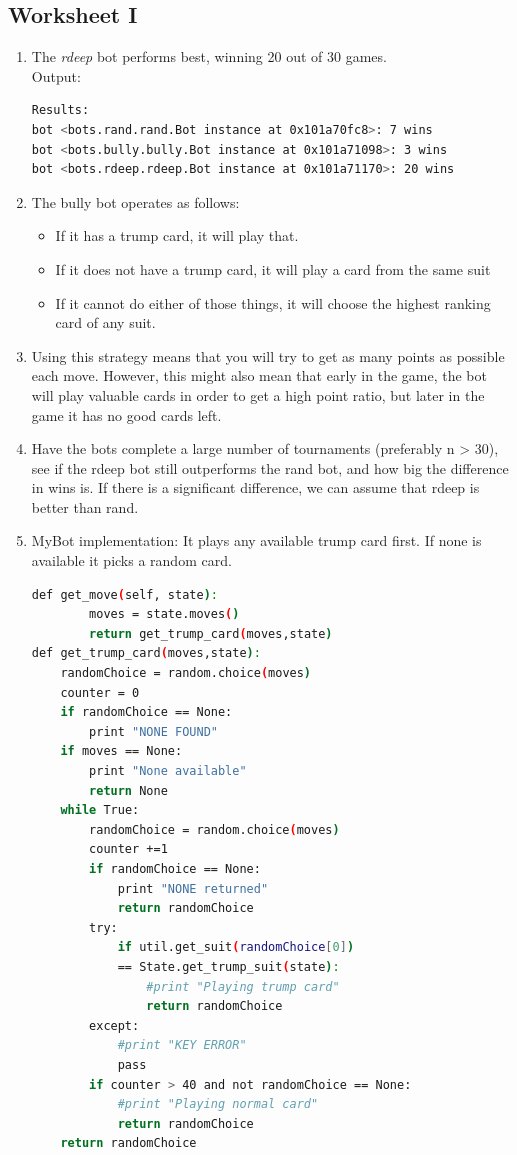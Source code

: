 \documentclass[a4paper,11pt]{article}
\begin{document}
\subsection{Worksheet I}
\begin{enumerate}

\item The \textit{rdeep} bot performs best, winning 20 out of 30 games. \\
Output:
\begin{lstlisting}[language=bash]
Results:
bot <bots.rand.rand.Bot instance at 0x101a70fc8>: 7 wins
bot <bots.bully.bully.Bot instance at 0x101a71098>: 3 wins
bot <bots.rdeep.rdeep.Bot instance at 0x101a71170>: 20 wins
\end{lstlisting}

\item The bully bot operates as follows:
\begin{itemize}
\item If it has a trump card, it will play that.
\item If it does not have a trump card, it will play a card from the same suit
\item If it cannot do either of those things, it will choose the highest ranking card of any suit.
\end{itemize}

\item Using this strategy means that you will try to get as many points as possible each move. However, this might also mean that early in the game, the bot will play valuable cards in order to get a high point ratio, but later in the game it has no good cards left. 

\item Have the bots complete a large number of tournaments (preferably n > 30), see if the rdeep bot still outperforms the rand bot, and how big the difference in wins is. If there is a significant difference, we can assume that rdeep is better than rand.

\item MyBot implementation:
It plays any available trump card first. If none is available it picks a random card.

\begin{lstlisting}[language=bash]
def get_move(self, state):
        moves = state.moves()
        return get_trump_card(moves,state)
def get_trump_card(moves,state):
    randomChoice = random.choice(moves)
    counter = 0
    if randomChoice == None:
        print "NONE FOUND"
    if moves == None:
        print "None available"
        return None
    while True:
        randomChoice = random.choice(moves)
        counter +=1
        if randomChoice == None:
            print "NONE returned"
            return randomChoice
        try:
            if util.get_suit(randomChoice[0]) 
            == State.get_trump_suit(state):
                #print "Playing trump card"
                return randomChoice
        except:
            #print "KEY ERROR"
            pass
        if counter > 40 and not randomChoice == None:
            #print "Playing normal card"
            return randomChoice
    return randomChoice
\end{lstlisting}


\end{enumerate}
\end{document}
